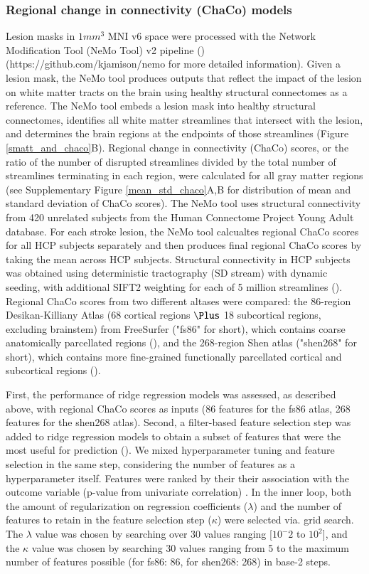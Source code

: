 \documentclass[phd,tocprelim]{cornell}
\begin{document}
\subsubsection*{Regional change in connectivity (ChaCo) models}
Lesion masks in $1mm^3$ MNI v6 space were processed with the Network Modification Tool (NeMo Tool) v2 pipeline (\cite{Kuceyeski2013-nk}) (https://github.com/kjamison/nemo for more detailed information). Given a lesion mask, the NeMo tool produces outputs that reflect the impact of the lesion on white matter tracts on the brain using healthy structural connectomes as a reference. The NeMo tool embeds a lesion mask into healthy structural connectomes, identifies all white matter streamlines that intersect with the lesion, and determines the brain regions at the endpoints of those streamlines (Figure \ref{smatt_and_chaco}B). Regional change in connectivity (ChaCo) scores, or the ratio of the number of disrupted streamlines divided by the total number of streamlines terminating in each region, were calculated for all gray matter regions (see Supplementary Figure \ref{mean_std_chaco}A,B for distribution of mean and standard deviation of ChaCo scores). The NeMo tool uses structural connectivity from 420 unrelated subjects from the Human Connectome Project Young Adult database. For each stroke lesion, the NeMo tool calcualtes regional ChaCo scores for all HCP subjects separately and then produces final regional ChaCo scores by taking the mean across HCP subjects. Structural connectivity in HCP subjects was obtained using deterministic tractography (SD stream) with dynamic seeding, with additional SIFT2 weighting for each of 5 million streamlines (\cite{Smith2015-eb}). Regional ChaCo scores from two different altases were compared: the 86-region Desikan-Killiany Atlas (68 cortical regions $\Plus$ 18 subcortical regions, excluding brainstem) from FreeSurfer ("fs86" for short), which contains coarse anatomically parcellated regions (\cite{Desikan2006-vf,Fischl2002-lb}), and the 268-region Shen atlas ("shen268" for short), which contains more fine-grained functionally parcellated cortical and subcortical regions (\cite{Shen2013-zn}).

First, the performance of ridge regression models was assessed, as described above, with regional ChaCo scores as inputs (86 features for the fs86 atlas, 268 features for the shen268 atlas). Second, a filter-based feature selection step was added to ridge regression models to obtain a subset of features that were the most useful for prediction (\cite{Guyon2003-kj, Hall1999-qr, Pudjihartono2022-zg}). We mixed hyperparameter tuning and feature selection in the same step, considering the number of features as a hyperparameter itself. Features were ranked by their their association with the outcome variable (p-value from univariate correlation) . In the inner loop, both the amount of regularization on regression coefficients ($\lambda$) and the number of features to retain in the feature selection step ($\kappa$) were selected via. grid search. The $\lambda$ value was chosen by searching over 30 values ranging [$10^-2$ to $10^2$], and the $\kappa$ value was chosen by searching 30 values ranging from 5 to the maximum number of features possible (for fs86: 86, for shen268: 268) in base-2 steps. 
\end{document}
